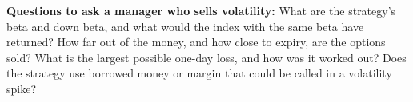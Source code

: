 \textbf{Questions to ask a manager who sells volatility:} What are the strategy's beta and down beta, and what would the index with the same beta have returned? How far out of the money, and how close to expiry, are the options sold? What is the largest possible one-day loss, and how was it worked out? Does the strategy use borrowed money or margin that could be called in a volatility spike?


